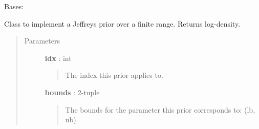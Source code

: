 \documentclass[letterpaper,10pt,english]{sphinxmanual}
\begin{document}

\begin{fulllineitems}
\label{gptools:gptools.utils.JeffreysPrior}
Bases: 

Class to implement a Jeffreys prior over a finite range. Returns log-density.
\begin{quote}\begin{description}
\item[{Parameters}] \leavevmode
\textbf{idx} : int
\begin{quote}

The index this prior applies to.
\end{quote}

\textbf{bounds} : 2-tuple
\begin{quote}

The bounds for the parameter this prior corresponds to: (lb, ub).
\end{quote}

\end{description}\end{quote}

\begin{fulllineitems}
\label{gptools:gptools.utils.JeffreysPrior.__call__}
\end{fulllineitems}


\begin{fulllineitems}
\label{gptools:gptools.utils.JeffreysPrior.interval}
\end{fulllineitems}


\end{fulllineitems}

\end{document}
